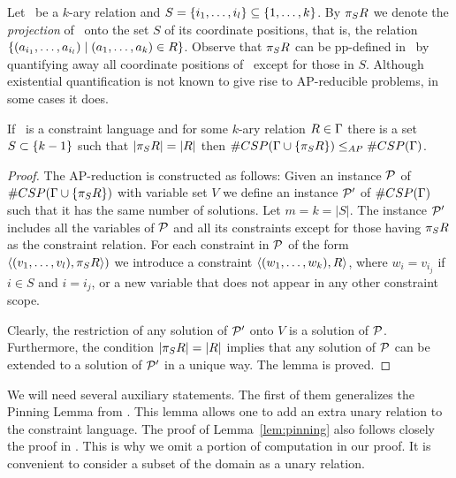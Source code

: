 Let \mR\ be a \(k\)-ary relation and \(S=\{i_1,\dotsc,i_l\} \subseteq \{1,\dotsc,k\}\)\@.
By \(\pi_{S}{R}\) we denote the \emph{projection} of \mR\ onto the set \(S\) of its coordinate
positions, that is, the relation \(\{(a_{i_1},\dotsc,a_{i_l}) \mid (a_1,\dotsc,a_k)\in R\}\)\@.
Observe that \(\pi_{S}{R}\) can be pp-defined in \mR\ by quantifying away all coordinate positions of
\mR\ except for those in \(S\)\@.
Although existential quantification is not known to give rise to AP-reducible problems, in some
cases it does.

\begin{lemma}\label{lem:projection}
If \mrelset\ is a constraint language and for some \(k\)-ary relation \(R\in\Gamma\)
there is a set \(S\subset \{k-1\}\) such that \(|\pi_{S}{R}|=|R|\) then 
\(\#CSP(\Gamma \cup \{\pi_{S}{R}\}) \le_{AP} \#CSP(\Gamma)\).
\end{lemma}

\begin{proof}
The AP-reduction is constructed as follows: Given an instance \(\mathcal{P}\)
of \(\#CSP(\Gamma\cup \{\pi_{S}{R}\})\) with variable set \(V\) we define an 
instance \(\mathcal{P}'\) of \(\#CSP(\Gamma)\) such that it has the same number of solutions.
Let \(m=k=|S|\)\@. The instance \(\mathcal{P}'\) includes all the variables of \(\mathcal{P}\)
and all its constraints except for those having \(\pi_{S}{R}\) as the constraint relation. For each
constraint in \(\mathcal{P}\) of the form \(\langle (v_1,\dotsc,v_l),\pi_{S}{R} \rangle)\)
we introduce a constraint \(\langle (w_1,\dotsc,w_k),R \rangle\), where 
\(w_i=v_{i_j}\) if \(i\in S\) and \(i=i_j\), or a new variable that does not appear in any other constraint scope. 

Clearly, the restriction of any solution of \(\mathcal{P}'\) onto \(V\) is a solution of \(\mathcal{P}\)\@.
Furthermore, the condition \(|\pi_{S}{R}|=|R|\) implies that any solution of \(\mathcal{P}\)
can be extended to a solution of \(\mathcal{P}'\) in a unique way. The lemma is proved.
\end{proof}


We will need several auxiliary statements. The first of them generalizes the Pinning Lemma from
\cite{Trichotomy}. This lemma allows one to add an extra unary relation to the constraint language.
The proof of Lemma~\ref{lem:pinning} also follows closely the proof in \cite{Trichotomy}. 
This is why we omit a portion of computation in our proof. It is convenient to consider a subset of the domain as a unary relation.

